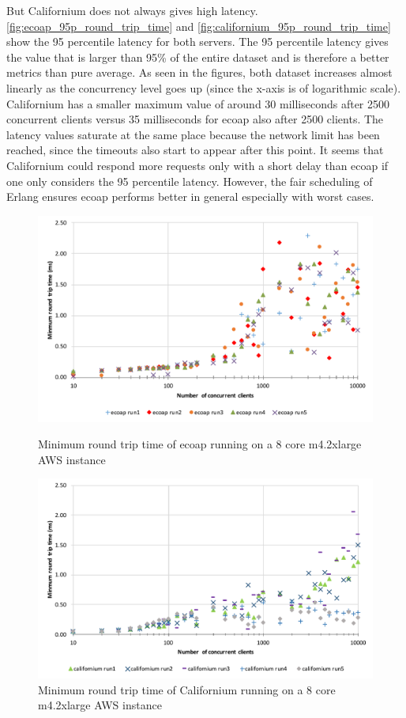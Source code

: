 But Californium does not always gives high latency. \autoref{fig:ecoap_95p_round_trip_time} and \autoref{fig:californium_95p_round_trip_time} show the 95 percentile latency for both servers. The 95 percentile latency gives the value that is larger than 95\% of the entire dataset and is therefore a better metrics than pure average. As seen in the figures, both dataset increases almost linearly as the concurrency level goes up (since the x-axis is of logarithmic scale). Californium has a smaller maximum value of around 30 milliseconds after 2500 concurrent clients versus 35 milliseconds for ecoap also after 2500 clients. The latency values saturate at the same place because the network limit has been reached, since the timeouts also start to appear after this point. It seems that Californium could respond more requests only with a short delay than ecoap if one only considers the 95 percentile latency. However, the fair scheduling of Erlang ensures ecoap performs better in general especially with worst cases.

\begin{figure}[!htbp]
\centering
\includegraphics[scale = 0.8]{ecoap_min_round_trip_time}
\caption{Minimum round trip time of ecoap running on a 8 core m4.2xlarge AWS instance}
\label{fig:ecoap_min_round_trip_time}
\includegraphics[scale = 0.8]{californium_min_round_trip_time}
\caption{Minimum round trip time of Californium running on a 8 core m4.2xlarge AWS instance}
\label{fig:californium_min_round_trip_time}
\end{figure}

